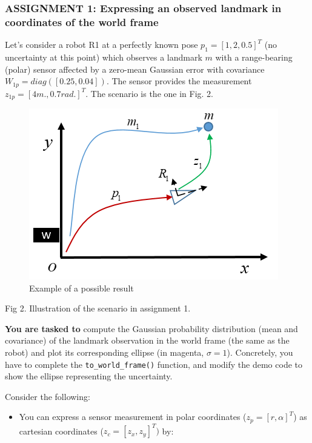\documentclass[11pt]{article}
\providecommand{\tightlist}{%
      \setlength{\itemsep}{0pt}\setlength{\parskip}{0pt}}
\begin{document}
    \hypertarget{assignment-1-expressing-an-observed-landmark-in-coordinates-of-the-world-frame}{%
\subsubsection{\texorpdfstring{\textbf{{ASSIGNMENT 1: Expressing an
observed landmark in coordinates of the world frame}}
}{ASSIGNMENT 1: Expressing an observed landmark in coordinates of the world frame }}\label{assignment-1-expressing-an-observed-landmark-in-coordinates-of-the-world-frame}}

Let's consider a robot R1 at a perfectly known pose
\(p_1 = [1, 2, 0.5]^T\) (no uncertainty at this point) which observes a
landmark \(m\) with a range-bearing (polar) sensor affected by a
zero-mean Gaussian error with covariance
\(W_{1p} = diag\left([0.25, 0.04]\right)\). The sensor provides the
measurement \(z_{1p} = [4m., 0.7rad.]^T\). The scenario is the one in
Fig. 2.

\begin{figure}
\centering
\includegraphics{images/assignment_1.png}
\caption{Example of a possible result}
\end{figure}
Fig 2. Illustration of the scenario in assignment 1.

\textbf{You are tasked to} compute the Gaussian probability distribution
(mean and covariance) of the landmark observation in the world frame
(the same as the robot) and plot its corresponding ellipse (in magenta,
\(\sigma=1\)). Concretely, you have to complete the
\texttt{to\_world\_frame()} function, and modify the demo code to show
the ellipse representing the uncertainty.

Consider the following:

\begin{itemize}
\tightlist
\item
  You can express a sensor measurement in polar coordinates
  (\(z_p=[r,\alpha]^T\)) as cartesian coordinates (\(z_c=[z_x,z_y]^T)\)
  by:
\end{itemize}
\end{document}
